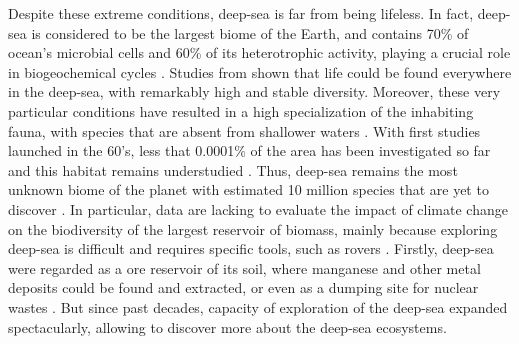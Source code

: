 Despite these extreme conditions, deep-sea is far from being lifeless. In fact, deep-sea is considered to be the largest biome of the Earth, and contains 70\% of ocean's microbial cells and 60\% of its heterotrophic activity, playing a crucial role in biogeochemical cycles \citep{salazar2016}. Studies from \citet{grassle1992,parkes1994,todo2005} shown that life could be found everywhere in the deep-sea, with remarkably high and stable diversity. Moreover, these very particular conditions have resulted in a high specialization of the inhabiting fauna, with species that are absent from shallower waters \citep{garcia2021}. With first studies launched in the 60's, less that 0.0001\% of the area has been investigated so far and this habitat remains understudied \citep{danovaro2017,richards2019}. Thus, deep-sea remains the most unknown biome of the planet with estimated 10 million species that are yet to discover \citep{danovaro2017,grassle1992}. In particular, data are lacking to evaluate the impact of climate change on the biodiversity of the largest reservoir of biomass, mainly because exploring deep-sea is difficult and requires specific tools, such as rovers \citep{danovaro2008,danovaro2014}. Firstly, deep-sea were regarded as a ore reservoir of its soil, where manganese and other metal deposits could be found and extracted, or even as a dumping site for nuclear wastes \citep{baker2020,gillet2013,halfar2002}. But since past decades, capacity of exploration of the deep-sea expanded spectacularly, allowing to discover more about the deep-sea ecosystems\citep{danovaro2014}.

